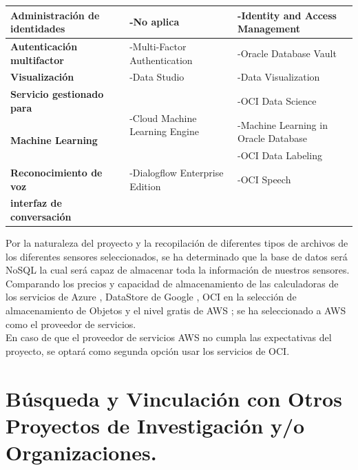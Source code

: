 \begin{table}[H]
{\begin{tabular}{|l|l|l|}
\textbf{Administración   de identidades} & -No   aplica & -Identity and   Access Management \\ \hline
\multirow{2}{*}{\textbf{Autenticación multifactor}} & \multirow{2}{*}{-Multi-Factor Authentication} & \multirow{2}{*}{-Oracle Database Vault} \\
 &  &  \\ \hline
\textbf{Visualización} & -Data   Studio & -Data   Visualization \\ \hline
\textbf{Servicio gestionado para} & \multirow{3}{*}{-Cloud Machine Learning Engine} & -OCI Data   Science \\
\multirow{2}{*}{\textbf{Machine Learning}} &  & -Machine Learning in Oracle   Database \\
 &  & -OCI Data Labeling \\ \hline
\textbf{Reconocimiento de voz} & -Dialogflow Enterprise Edition & -OCI Speech \\
\textbf{interfaz de conversación} &  &  \\ \hline
\end{tabular}%
}
\label{tab7-2}
\end{table}

\newpage


\noindent Por la naturaleza del proyecto y la recopilación de diferentes tipos de archivos de los diferentes sensores seleccionados, se ha determinado que la base de datos será NoSQL la cual será capaz de almacenar toda la información de nuestros sensores.\\
Comparando los precios y capacidad de almacenamiento de las calculadoras de los servicios de Azure \cite{105}, DataStore de Google \cite{106}, OCI en la selección de almacenamiento de Objetos \cite{107} y el nivel gratis de AWS \cite{108}; se ha seleccionado a AWS como el proveedor de servicios.\\
En caso de que el proveedor de servicios AWS no cumpla las expectativas del proyecto, se optará como segunda opción usar los servicios de OCI.

\newpage
\section{Búsqueda y Vinculación con Otros Proyectos de Investigación y/o Organizaciones.}
\label{busqueda}

